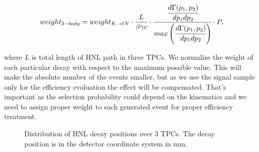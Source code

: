 \documentclass[../main.tex]{subfiles}
\begin{document}
\begin{equation}
    weight_{3-body}=weight_{K\rightarrow \ell N}\cdot\frac{L}{\beta\gamma c}\cdot\cfrac{\cfrac{d\Gamma(p_1,p_2)}{dp_1dp_2}}{max\left(\cfrac{d\Gamma(p_1,p_2)}{dp_1dp_2}\right)}\cdot P,
\end{equation}

where $L$ is total length of HNL path in three TPCs. We normalize the weight of each particular decay with respect to the maximum possible value. This will make the absolute number of the events smaller, but as we use the signal sample only for the efficiency evoluation the effect will be compensated. That's important as the selection probability could depend on the kinematics and we need to assign proper weight to each generated event for proper efficiency treatment.

\begin{figure}[!ht]
    \caption{Distribution of HNL decay positions over 3 TPCs. The decay position is in the detector coordinate system in mm.}
    \label{fig:HNL:decayPos}
\end{figure}

\end{document}
